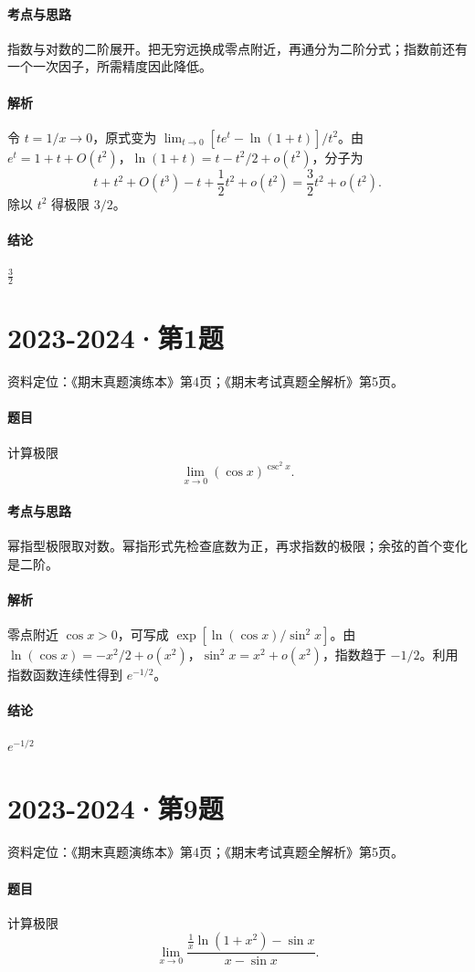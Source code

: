 \documentclass[UTF8,fontset=fandol,12pt,oneside,openany]{ctexrep}
\theoremstyle{definition}
\begin{document}
\paragraph{考点与思路}
指数与对数的二阶展开。把无穷远换成零点附近，再通分为二阶分式；指数前还有一个一次因子，所需精度因此降低。
\paragraph{解析}
令 $t=1/x\to0$，原式变为 $\lim_{t\to0}[te^t-\ln(1+t)]/t^2$。由 $e^t=1+t+O(t^2)$，$\ln(1+t)=t-t^2/2+o(t^2)$，分子为 \[t+t^2+O(t^3)-t+\frac12t^2+o(t^2)=\frac32t^2+o(t^2).\]除以 $t^2$ 得极限 $3/2$。
\paragraph{结论}
$\frac32$

\par\addvspace{18pt}\noindent\begin{minipage}{\linewidth}
\section{2023-2024·第1题}
\label{exam:08:q4}
资料定位：《期末真题演练本》第4页；《期末考试真题全解析》第5页。
\paragraph{题目}
计算极限 \[\lim_{x\to0}(\cos x)^{\csc^2x}.\]
\end{minipage}\par
\paragraph{考点与思路}
幂指型极限取对数。幂指形式先检查底数为正，再求指数的极限；余弦的首个变化是二阶。
\paragraph{解析}
零点附近 $\cos x>0$，可写成 $\exp[\ln(\cos x)/\sin^2x]$。由 $\ln(\cos x)=-x^2/2+o(x^2)$，$\sin^2x=x^2+o(x^2)$，指数趋于 $-1/2$。利用指数函数连续性得到 $e^{-1/2}$。
\paragraph{结论}
$e^{-1/2}$

\par\addvspace{18pt}\noindent\begin{minipage}{\linewidth}
\section{2023-2024·第9题}
\label{exam:08:q5}
资料定位：《期末真题演练本》第4页；《期末考试真题全解析》第5页。
\paragraph{题目}
计算极限 \[\lim_{x\to0}\frac{\frac1x\ln(1+x^2)-\sin x}{x-\sin x}.\]
\end{minipage}\par
\end{document}
